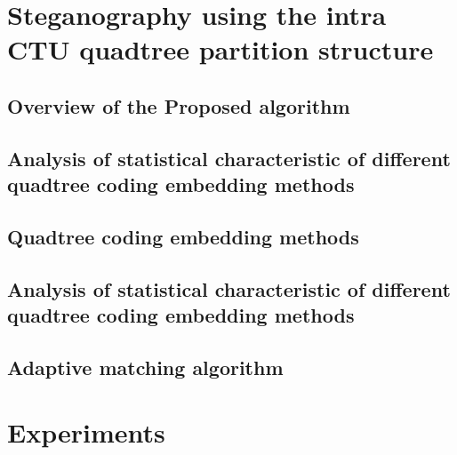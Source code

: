 \documentclass[journal,sort]{IEEEtran}
\begin{document}
\section{Steganography using the intra CTU quadtree partition structure}


\subsection{Overview of the Proposed algorithm}

\subsection{Analysis of statistical characteristic of different quadtree coding embedding methods}
\subsection{Quadtree coding embedding methods}

\subsection{Analysis of statistical characteristic of different quadtree coding embedding methods}

\subsection{Adaptive matching algorithm}


\section{Experiments}




	
	
	
	
	
	
	
\end{document}
